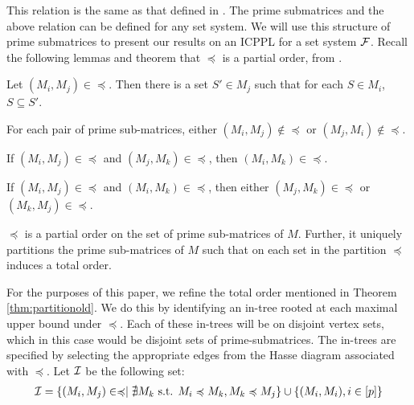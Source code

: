 \documentclass{fsttcs}
\def\cF{{\cal F}}
\def\cI{{\cal I}}
\begin{document}
\noindent
This relation is the same as that defined in \cite{nsnrs09}. The prime
submatrices and the above relation can be defined for any set
system. We will use this structure of prime submatrices to present our
results on an ICPPL for a set system $\cF$. Recall the following
lemmas and theorem that $\preccurlyeq$ is a partial order, from
\cite{nsnrs09}.

\begin{lemma} \label{lem:containment}
Let $(M_i,M_j) \in \preccurlyeq$.  Then there is a set $S' \in M_j$ such that for each $S \in M_i$, $S \subseteq S'$. 
\end{lemma}
\vspace{-3mm}
\begin{lemma}
For each pair of prime sub-matrices, either $(M_i,M_j) \not\in \preccurlyeq$ or $(M_j,M_i) \not\in \preccurlyeq$.
\end{lemma}
\vspace{-3mm}
\begin{lemma}
If $(M_i,M_j) \in \preccurlyeq $ and $(M_j,M_k) \in \preccurlyeq$, then $(M_i,M_k) \in \preccurlyeq$.
\end{lemma}
\vspace{-3mm}
\begin{lemma} \label{lem:twoparents}
If $(M_i,M_j) \in \preccurlyeq$ and $(M_i,M_k) \in \preccurlyeq$, then
either $(M_j,M_k) \in \preccurlyeq$ or $(M_k,M_j) \in \preccurlyeq$. 
\end{lemma}
\vspace{-3mm}
\begin{theorem} \label{thm:partitionold}
  $\preccurlyeq$ is a partial order on the set of prime sub-matrices
  of $M$.  Further, it uniquely partitions the prime sub-matrices of
  $M$ such that on each set in the partition $\preccurlyeq$ induces a
  total order.
\end{theorem}
\noindent
For the purposes of this paper, we refine the total order mentioned in
Theorem \ref{thm:partitionold}. We do this by identifying an in-tree
rooted at each maximal upper bound under $\preccurlyeq$.  Each of
these in-trees will be on disjoint vertex sets, which in this case
would be disjoint sets of prime-submatrices.  The in-trees are
specified by selecting the appropriate edges from the Hasse diagram
associated with $\preccurlyeq$.  Let $\cI$ be the following set:
\vspace{-3mm}
\begin{align*}
  \cI = \{ (M_i,M_j) \space \in \space \preccurlyeq \mid \nexists M_k \text{ s.t. } M_i \preccurlyeq M_k, M_k \preccurlyeq M_j
  \} \cup \{ (M_i,M_i), i \in [p] \}
\end{align*}
\end{document}
